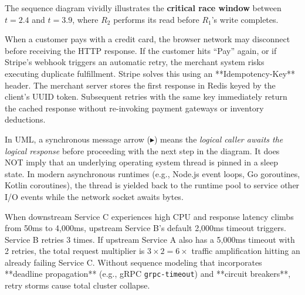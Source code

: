 The sequence diagram vividly illustrates the \textbf{critical race window} between $t = 2.4$ and $t = 3.9$, where $R_2$ performs its read before $R_1$'s write completes.

\begin{realworldbox}
When a customer pays with a credit card, the browser network may disconnect before receiving the HTTP response. If the customer hits ``Pay'' again, or if Stripe's webhook triggers an automatic retry, the merchant system risks executing duplicate fulfillment. Stripe solves this using an **Idempotency-Key** header. The merchant server stores the first response in Redis keyed by the client's UUID token. Subsequent retries with the same key immediately return the cached response without re-invoking payment gateways or inventory deductions.
\end{realworldbox}

\begin{commonmistakebox}
In UML, a synchronous message arrow ($\blacktriangleright$) means the \textit{logical caller awaits the logical response} before proceeding with the next step in the diagram. It does NOT imply that an underlying operating system thread is pinned in a sleep state. In modern asynchronous runtimes (e.g., Node.js event loops, Go goroutines, Kotlin coroutines), the thread is yielded back to the runtime pool to service other I/O events while the network socket awaits bytes.
\end{commonmistakebox}

\begin{productionwarningbox}
When downstream Service C experiences high CPU and response latency climbs from 50ms to 4,000ms, upstream Service B's default 2,000ms timeout triggers. Service B retries 3 times. If upstream Service A also has a 5,000ms timeout with 2 retries, the total request multiplier is $3 \times 2 = 6\times$ traffic amplification hitting an already failing Service C. Without sequence modeling that incorporates **deadline propagation** (e.g., gRPC \texttt{grpc-timeout}) and **circuit breakers**, retry storms cause total cluster collapse.
\end{productionwarningbox}

